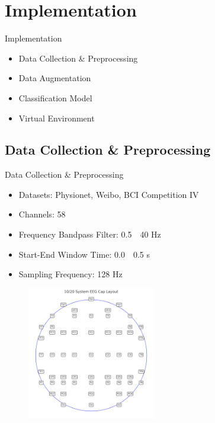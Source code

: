 \section{Implementation}
\begin{frame}{Implementation}
    \begin{itemize}
        \item Data Collection \& Preprocessing
        \item Data Augmentation
        \item Classification Model
        \item Virtual Environment
    \end{itemize}
\end{frame}

\subsection*{Data Collection \& Preprocessing}
\begin{frame}{Data Collection \& Preprocessing}
    \begin{minipage}[c]{.6\textwidth}
        \begin{itemize}
            \item Datasets: Physionet, Weibo, BCI Competition IV
            \item Channels: 58
            \item Frequency Bandpass Filter: 0.5~\textemdash{}~40 Hz
            \item Start-End Window Time: 0.0~\textemdash{}~0.5 s
            \item Sampling Frequency: 128 Hz
        \end{itemize}
    \end{minipage}
    \begin{minipage}[c]{.39\textwidth}
        \begin{figure}[!htbp]
            \centering
            \includegraphics[width=0.5\textwidth]{figures/Methodology/thesis_eeg_cap}
        \end{figure}
    \end{minipage}
\end{frame}

